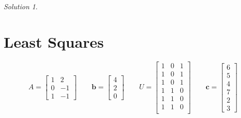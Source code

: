 \documentclass{article}
\theoremstyle{remark}
\newtheorem*{solution}{Solution}
\newcommand{\vv}[1]{\mathbf{#1}}
\begin{document}
\medskip

\begin{solution}
\end{solution}

\pagebreak
\section{Least Squares}

\begin{displaymath}
  A =
  \begin{bmatrix}
    1 & 2 \\
    0 & -1 \\
    1 & -1
  \end{bmatrix}
  \qquad
  \vv b =
  \begin{bmatrix}
    4 \\ 2 \\ 0
  \end{bmatrix}
  \qquad
  U =
  \begin{bmatrix}
    1 & 0 & 1 \\
    1 & 0 & 1 \\
    1 & 0 & 1 \\
    1 & 1 & 0 \\
    1 & 1 & 0 \\
    1 & 1 & 0 \\
  \end{bmatrix}
  \qquad
  \vv c =
  \begin{bmatrix}
    6 \\ 5 \\ 4 \\ 7 \\ 2 \\ 3
  \end{bmatrix}
\end{displaymath}
\end{document}
